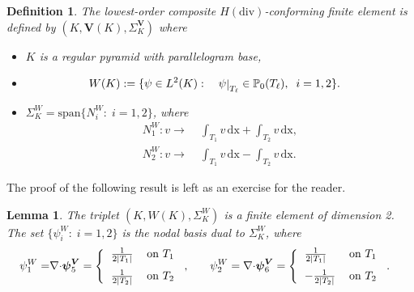 \documentclass[twoside,reqno,final]{amsart}
\newtheorem{lemma}{Lemma}
\renewcommand{\b}[1]{{\boldsymbol{#1}}}
\def\restrict#1{\raise-0.2ex\hbox{\ensuremath|}_{#1}}
\newcommand{\divs}{{\nabla\cdot}}
\newtheorem{definition}[theorem]{Definition}
\newcommand{\pol}{\mathbb{P}}
\begin{document}
\begin{definition}
\label{L2-def}
The lowest-order 
composite $H(\mathrm{div})$-conforming finite element is defined by 
$(K, \b V(K), \Sigma^{\b V}_K)$ where
\begin{itemize}
\item $K$ is a regular pyramid with parallelogram base,
 \item 
 \begin{alignat}{3}
\label{L2}
W(K) :=&\; \{\psi \in L^2(K):&& \;
\psi\restrict{T_\ell}\in \pol_0(T_\ell),\;\; i = 1,2\}.
\end{alignat}
\item 
$\Sigma_K^{W}=\mathrm{span}\{N_i^{W}:\;i=1,2\}$, where
\begin{align*}
N_1^{W} : v\longrightarrow &\;
\int_{T_1} v\,\mathrm{dx}+
 \int_{T_2} v\,\mathrm{dx},\\ 
N_2^{W} : v\longrightarrow &\;
\int_{T_1} v\,\mathrm{dx}-
 \int_{T_2} v\,\mathrm{dx}.
\end{align*}
\end{itemize}
\end{definition}

The proof of the following result is left as an exercise for the reader.
\begin{lemma}
\label{lemma-4}
The triplet  $(K,W(K), \Sigma^{W}_K)$ is a finite element of dimension 2.
The set $\{\psi^{W}_i:\;i=1,2\}$ is the nodal basis dual to 
$\Sigma^{W}_K$, where 
 \begin{alignat*}{3}
 \psi^W_1 =& 
 \divs \b\psi^{\b V}_5 =
 \left\{ \begin{tabular}{l l}
            $\frac{1}{2|T_1|}$ & on $T_1$\vspace{0.2cm}\\
            $\frac{1}{2|T_2|}$ & on $T_2$
            \end{tabular}\right.,
\quad && 
  \psi^W_2 =\divs \b\psi^{\b V}_6=
  \left\{ \begin{tabular}{l l}
            $\frac{1}{2|T_1|}$ & on $T_1$\vspace{0.2cm}\\
            $-\frac{1}{2|T_2|}$ & on $T_2$
            \end{tabular}\right..
\end{alignat*}
\end{lemma}
\end{document}
